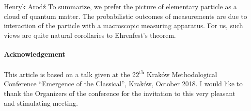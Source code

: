\begin{artengenv}{Henryk Arod\'z}
 To summarize, we prefer the picture of elementary particle as a cloud of quantum matter. The probabilistic outcomes of measurements are due to interaction of the particle with a macroscopic measuring apparatus. For us, such views are quite natural corollaries to Ehrenfest's theorem. 




\paragraph{Acknowledgement}
This article is based on a talk given at the 22\textsuperscript{th} Krak\'ow Methodological Conference ``Emergence of the Classical'', Krak\'ow, October 2018. I would like to thank the Organizers of the conference for the invitation to this very pleasant and stimulating meeting. 



 


\end{artengenv}\label{arodz-stop}